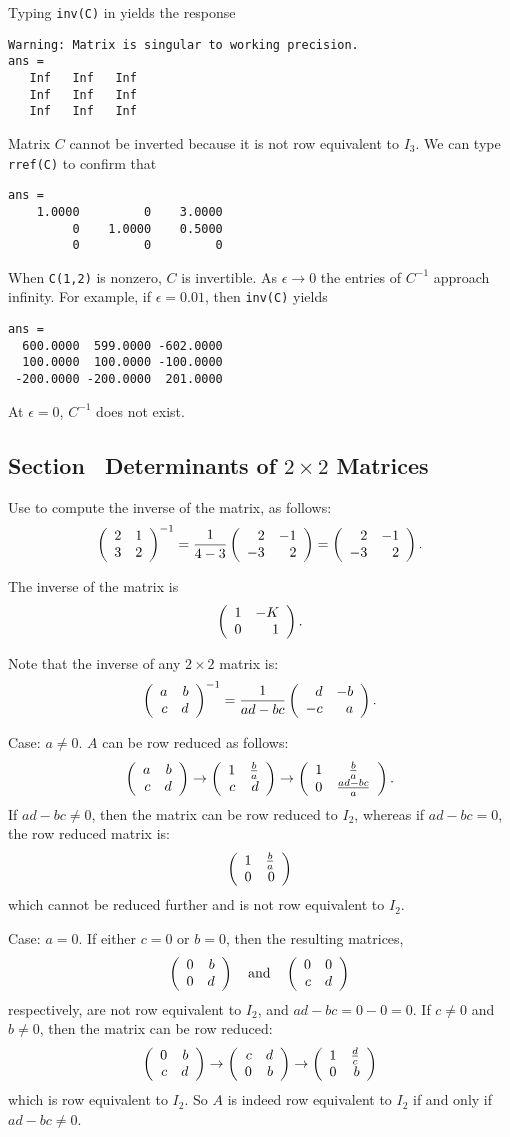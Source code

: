 Typing {\tt inv(C)} in \Matlab yields the response
\begin{verbatim}
Warning: Matrix is singular to working precision.
ans =
   Inf   Inf   Inf
   Inf   Inf   Inf
   Inf   Inf   Inf
\end{verbatim}
Matrix $C$ cannot be inverted because it is not row equivalent to $I_3$.
We can type {\tt rref(C)} to confirm that
\begin{verbatim}
ans =
    1.0000         0    3.0000
         0    1.0000    0.5000
         0         0         0
\end{verbatim}
\para When {\tt C(1,2)} is nonzero, $C$ is invertible.  As $\epsilon
\rightarrow 0$ the entries of $C^{-1}$ approach infinity.  For example,
if $\epsilon = 0.01$, then {\tt inv(C)} yields
\begin{verbatim}
ans =
  600.0000  599.0000 -602.0000
  100.0000  100.0000 -100.0000
 -200.0000 -200.0000  201.0000
\end{verbatim}
At $\epsilon = 0$, $C^{-1}$ does not exist.


\subsection*{Section~\protect{\ref{S:det2x2}} Determinants of $2\times 2$ Matrices}

Use  to compute the inverse of the matrix,
as follows:
\[ \left(\begin{array}{rr} 2 & 1\\ 3 &2\end{array}\right)^{-1} = \frac{1}{4-3}\left(\begin{array}{rr} 2 & -1\\ -3 &2\end{array}\right)
= \left(\begin{array}{rr} 2 & -1\\ -3 &2\end{array}\right). \]

\ans The inverse of the matrix is
\[
\left(\begin{array}{rr} 1 & -K\\ 0 &1\end{array}\right).
\]

\soln Note that the inverse of any $2 \times 2$ matrix is:
\[ \left(\begin{array}{rr} a & b\\ c &d\end{array}\right)^{-1} = \frac{1}{ad - bc}\left(\begin{array}{rr} d & -b\\ -c &a\end{array}\right). \]


Case: $a \neq 0$.  $A$ can be row reduced as follows:
\[ \left(\begin{array}{rr} a & b\\ c &d\end{array}\right) \rightarrow
\left(\begin{array}{rr} 1 & \frac{b}{a}\\ c &d\end{array}\right) \rightarrow
\left(\begin{array}{cc} 1 & \frac{b}{a}\\ 0 &\frac{ad - bc}{a}\end{array}\right). \]
If $ad - bc \neq 0$, then the matrix can be row reduced to $I_2$, whereas
if $ad - bc = 0$, the row reduced matrix is:
\[ \left(\begin{array}{rr} 1 & \frac{b}{a}\\ 0 &0\end{array}\right) \]
which cannot be reduced further and is not row equivalent to $I_2$.

Case: $a = 0$.  If either $c = 0$ or $b = 0$, then the resulting matrices,
\[ \left(\begin{array}{rr} 0 & b\\ 0 &d\end{array}\right) \quad\mbox{and}\quad \left(\begin{array}{rr} 0 & 0\\ c &d\end{array}\right) \]
respectively, are not row equivalent to $I_2$, and $ad - bc = 0 - 0 = 0$.
If $c \neq 0$ and $b \neq 0$, then the matrix can be row reduced:
\[ \left(\begin{array}{rr} 0 & b\\ c &d\end{array}\right) \rightarrow
\left(\begin{array}{rr} c & d\\ 0 &b\end{array}\right) \rightarrow \left(\begin{array}{rr} 1 & \frac{d}{c}\\ 0 &b\end{array}\right) \]
which is row equivalent to $I_2$.  So $A$ is indeed row equivalent
to $I_2$ if and only if $ad - bc \neq 0$.

